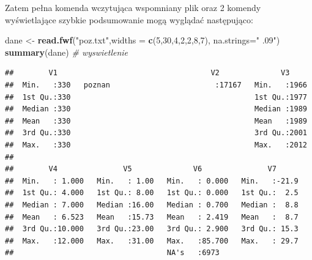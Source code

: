 \documentclass[]{book}
\newenvironment{Shaded}{\begin{snugshade}}{\end{snugshade}}
\newcommand{\KeywordTok}[1]{\textcolor[rgb]{0.13,0.29,0.53}{\textbf{#1}}}
\newcommand{\DataTypeTok}[1]{\textcolor[rgb]{0.13,0.29,0.53}{#1}}
\newcommand{\DecValTok}[1]{\textcolor[rgb]{0.00,0.00,0.81}{#1}}
\newcommand{\StringTok}[1]{\textcolor[rgb]{0.31,0.60,0.02}{#1}}
\newcommand{\CommentTok}[1]{\textcolor[rgb]{0.56,0.35,0.01}{\textit{#1}}}
\newcommand{\OperatorTok}[1]{\textcolor[rgb]{0.81,0.36,0.00}{\textbf{#1}}}
\newcommand{\NormalTok}[1]{#1}
\theoremstyle{definition}
\theoremstyle{definition}
\theoremstyle{definition}
\theoremstyle{remark}
\begin{document}
Zatem pełna komenda wczytująca wspomniany plik oraz 2 komendy
wyświetlające szybkie podsumowanie mogą wyglądać następująco:

\begin{Shaded}
\begin{Highlighting}[]
\NormalTok{dane <-}\StringTok{ }\KeywordTok{read.fwf}\NormalTok{(}\StringTok{"poz.txt"}\NormalTok{,}\DataTypeTok{widths =} \KeywordTok{c}\NormalTok{(}\DecValTok{5}\NormalTok{,}\DecValTok{30}\NormalTok{,}\DecValTok{4}\NormalTok{,}\DecValTok{2}\NormalTok{,}\DecValTok{2}\NormalTok{,}\DecValTok{8}\NormalTok{,}\DecValTok{7}\NormalTok{), }\DataTypeTok{na.strings=}\StringTok{"     .09"}\NormalTok{)}
\KeywordTok{summary}\NormalTok{(dane) }\CommentTok{# wyswietlenie}
\end{Highlighting}
\end{Shaded}

\begin{verbatim}
##        V1                                   V2              V3      
##  Min.   :330   poznan                        :17167   Min.   :1966  
##  1st Qu.:330                                          1st Qu.:1977  
##  Median :330                                          Median :1989  
##  Mean   :330                                          Mean   :1989  
##  3rd Qu.:330                                          3rd Qu.:2001  
##  Max.   :330                                          Max.   :2012  
##                                                                     
##        V4               V5              V6               V7       
##  Min.   : 1.000   Min.   : 1.00   Min.   : 0.000   Min.   :-21.9  
##  1st Qu.: 4.000   1st Qu.: 8.00   1st Qu.: 0.000   1st Qu.:  2.5  
##  Median : 7.000   Median :16.00   Median : 0.700   Median :  8.8  
##  Mean   : 6.523   Mean   :15.73   Mean   : 2.419   Mean   :  8.7  
##  3rd Qu.:10.000   3rd Qu.:23.00   3rd Qu.: 2.900   3rd Qu.: 15.3  
##  Max.   :12.000   Max.   :31.00   Max.   :85.700   Max.   : 29.7  
##                                   NA's   :6973
\end{verbatim}

\begin{Shaded}
\end{Shaded}
\end{document}
